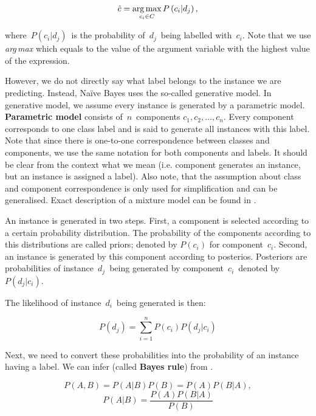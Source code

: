 \begin{equation}
	\label{eq:argmax}
	\hat{c} = \operatorname*{arg\,max}_{c_i \in C} P\left(c_i  | d_j \right),
\end{equation}

where~$P\left(c_i | d_j\right)$~is the probability of~$d_j$~being labelled with~$c_i$.
Note that we use \textit{arg\,max} which equals to the value of the argument variable
with the highest value of the expression.

However, we do not directly say what label belongs to the instance we are predicting.
Instead, Na\"{i}ve Bayes uses the so-called generative model.
In generative model, we assume every instance is generated by a parametric model.
\textbf{Parametric model} consists of~$n$~components $c_1, c_2,\ldots, c_n$.
Every component corresponds to one class label
and is said to generate all instances with this label.
Note that since there is one-to-one correspondence between classes and components,
we use the same notation for both components and labels.
It should be clear from the context what we mean (i.e. component generates an instance,
but an instance is assigned a label).
Also note, that the assumption about class and component correspondence is only used for simplification and can be generalised.
Exact description of a mixture model can be found in 
\citet{DBLP:journals/corr/cmp-lg-9705005}.

An instance is generated in two steps.
First, a component is selected according to a certain probability distribution.
The probability of the components according to this distributions are
called priors; denoted by $P\left(c_i\right)$ for component~$c_i$.
Second, an instance is generated by this component according to posterios.
Posteriors are probabilities of instance~$d_j$~being generated by component~$c_i$~denoted by~$P\left(d_j|c_i\right)$.

The likelihood of instance~$d_i$~being generated is then:

\begin{equation}
	P\left(d_j\right) = \sum_{i=1}^{n}{
	P\left(c_i\right)
	P\left(d_j|c_i\right)
}
\end{equation}

Next, we need to convert these probabilities into the probability of an instance having a label.
We can infer  (called \textbf{Bayes rule}) from .

\begin{equation}
	\label{eq:bayesinfer}
	P\left(A,B\right) = 
	P\left(A|B\right)
	P\left(B\right) = 
	P\left(A\right)
	P\left(B|A\right),
\end{equation}
\begin{equation}
	\label{eq:bayesrule}
	P\left(A|B\right) =
	\frac{
	P\left(A\right)
P\left(B|A\right)}
{P\left(B\right)}
\end{equation}

